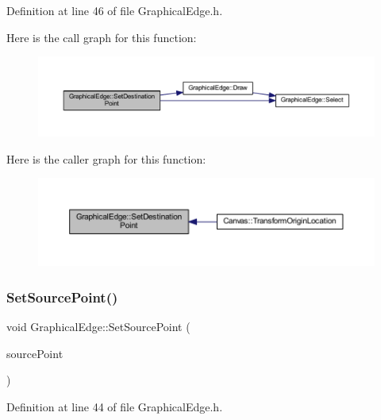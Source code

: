 Definition at line 46 of file Graphical\+Edge.\+h.

Here is the call graph for this function\+:
\nopagebreak
\begin{figure}[H]
\begin{center}
\leavevmode
\includegraphics[width=350pt]{class_graphical_edge_af6eedeeadcd9abc368b1c0725617f5c9_cgraph}
\end{center}
\end{figure}
Here is the caller graph for this function\+:
\nopagebreak
\begin{figure}[H]
\begin{center}
\leavevmode
\includegraphics[width=350pt]{class_graphical_edge_af6eedeeadcd9abc368b1c0725617f5c9_icgraph}
\end{center}
\end{figure}
\mbox{\label{class_graphical_edge_a02acb6e42ac2d6def8a662006db2b1ff}} 
\subsubsection{\texorpdfstring{Set\+Source\+Point()}{SetSourcePoint()}}
{\footnotesize\ttfamily void Graphical\+Edge\+::\+Set\+Source\+Point (\begin{DoxyParamCaption}\item[{wx\+Point2\+D\+Double}]{source\+Point }\end{DoxyParamCaption})\hspace{0.3cm}{\ttfamily [inline]}}



Definition at line 44 of file Graphical\+Edge.\+h.

